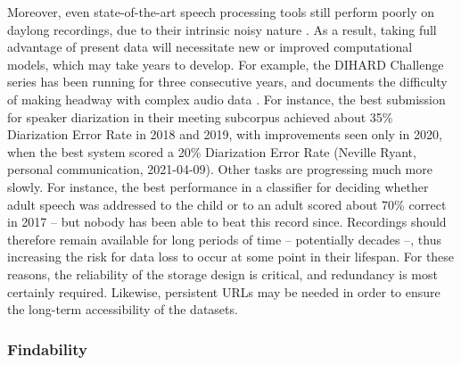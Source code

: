 \documentclass[smallextended]{svjour3}       %
\begin{document}
Moreover, even state-of-the-art speech processing tools still perform poorly on daylong recordings, due to their intrinsic noisy nature \citep{casillas2019step}. As a result, taking full advantage of present data will necessitate new or improved computational models, which may take years to develop. For example, the DIHARD Challenge series has been running for three consecutive years, and documents the difficulty of making headway with complex audio data \citep{ryant2018first,ryant2019second,ryant2020third}. For instance, the best submission for speaker diarization in their meeting subcorpus achieved about 35\% Diarization Error Rate in 2018 and 2019, with improvements seen only in 2020, when the best system scored a 20\% Diarization Error Rate (Neville Ryant, personal communication, 2021-04-09). Other tasks are progressing much more slowly. For instance, the best performance in a classifier for deciding whether adult speech was addressed to the child or to an adult scored about 70\% correct in 2017 \citep{schuller2017interspeech} -- but nobody has been able to beat this record since. Recordings should therefore remain available for long periods of time -- potentially decades --, thus increasing the risk for data loss to occur at some point in their lifespan. For these reasons, the reliability of the storage design is critical, and redundancy is most certainly required. Likewise, persistent URLs may be needed in order to ensure the long-term accessibility of the datasets.

\subsubsection*{Findability}
\end{document}
